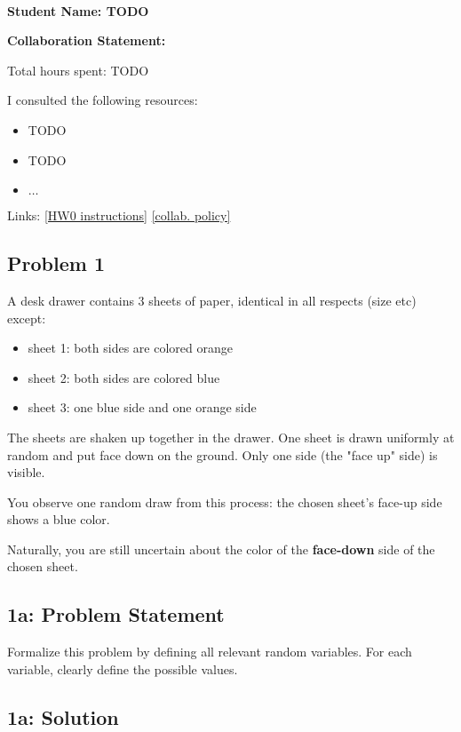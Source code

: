 \documentclass[10pt]{article}
\newcommand{\officialdirections}[1]{{\color{purple} #1}}
\begin{document}
~~\\ %

{\Large{\bf Student Name: TODO}}

\Large{\bf Collaboration Statement:}

Total hours spent: TODO

I consulted the following resources:
\begin{itemize}
\item TODO
\item TODO
\item $\ldots$	
\end{itemize}

Links: 
\href{https://www.cs.tufts.edu/cs/136/2023s/hw0.html}{[HW0 instructions]} 
\href{https://www.cs.tufts.edu/cs/136/2023s/index.html#collaboration}{[collab. policy]} 

\tableofcontents

\newpage
\officialdirections{
\subsection*{Problem 1}
A desk drawer contains 3 sheets of paper, identical in all respects (size etc) except:

\begin{itemize}
\item sheet 1: both sides are colored orange
\item sheet 2: both sides are colored blue
\item sheet 3: one blue side and one orange side
\end{itemize}

The sheets are shaken up together in the drawer. One sheet is drawn uniformly at random and put face down on the ground. Only one side (the "face up" side) is visible.

You observe one random draw from this process: the chosen sheet's face-up side shows a blue color.

Naturally, you are still uncertain about the color of the \textbf{face-down} side of the chosen sheet.
}

\officialdirections{
\subsection*{1a: Problem Statement}
Formalize this problem by defining all relevant random variables. For each variable, clearly define the possible values.
}
\subsection{1a: Solution}
\end{document}

